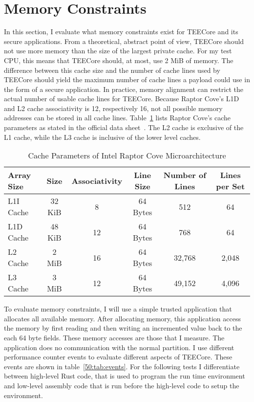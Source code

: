 \section{Memory Constraints}
\label{eval:mem_constraints}
In this section, I evaluate what memory constraints exist for TEECore and its
secure applications. From a theoretical, abstract point of view, TEECore should
not use more memory than the size of the largest private cache. For my test CPU,
this means that TEECore should, at most, use 2 MiB of memory. The difference
between this cache size and the number of cache lines used by TEECore should
yield the maximum number of cache lines a payload could use in the form of a
secure application. In practice, memory alignment can restrict the actual number
of usable cache lines for TEECore. Because Raptor Cove's L1D and L2 cache
associativity is 12, respectively 16, not all possible memory addresses can be
stored in all cache lines. Table~\ref{50:tab:cache_size} lists Raptor Cove's
cache parameters as stated in the official data
sheet~\cite{raptorlake_spec_sheet}. The L2 cache is exclusive of the L1 cache,
while the L3 cache is inclusive of the lower level caches.\\

\begin{table}[ht]
  \centering
  \begin{tabular}{ |l||c|c|c|c|c| }
    \hline
    Array Size & Size   & Associativity   & Line Size & Number of Lines & Lines per Set \\
    \hline
    L1I Cache  & 32 KiB & 8               & 64 Bytes  & 512             & 64            \\
    L1D Cache  & 48 KiB & 12              & 64 Bytes  & 768             & 64            \\
    L2 Cache   & 2 MiB  & 16              & 64 Bytes  & 32,768          & 2,048         \\
    L3 Cache   & 3 MiB  & 12              & 64 Bytes  & 49,152          & 4,096         \\
    \hline
  \end{tabular}
  \caption{Cache Parameters of Intel Raptor Cove Microarchitecture}
  \label{50:tab:cache_size}
\end{table}

To evaluate memory constraints, I will use a simple trusted application that
allocates all available memory. After allocating memory, this application access
the memory by first reading and then writing an incremented value back to the
each 64 byte fields. These memory accesses are those that I measure. The
application does no communication with the normal partition. I use different
performance counter events to evaluate different aspects of TEECore. These
events are shown in table~\ref{50:tab:events}. For the following tests I
differentiate between high-level Rust code, that is used to program the run time
environment and low-level assembly code that is run before the high-level code
to setup the environment.

